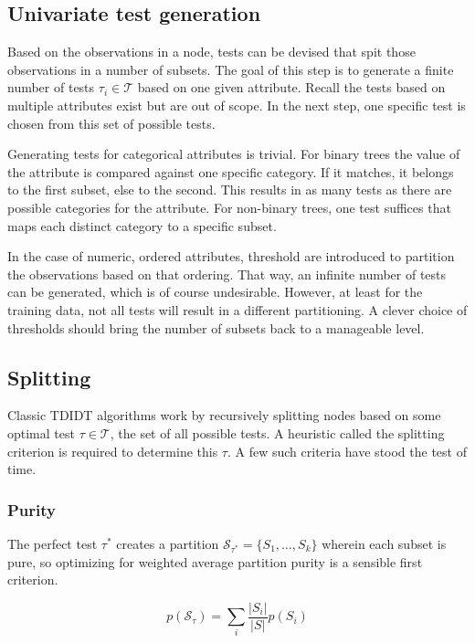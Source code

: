 \subsection{Univariate test generation}
Based on the observations in a node, tests can be devised that spit those observations in a number of subsets. The goal of this step is to generate a finite number of tests $\tau_i \in \mathcal{T}$ based on one given attribute. Recall the tests based on multiple attributes exist but are out of scope. In the next step, one specific test is chosen from this set of possible tests.

Generating tests for categorical attributes is trivial. For binary trees the value of the attribute is compared against one specific category. If it matches, it belongs to the first subset, else to the second. This results in as many tests as there are possible categories for the attribute. For non-binary trees, one test suffices that maps each distinct category to a specific subset.

In the case of numeric, ordered attributes, threshold are introduced to partition the observations based on that ordering. That way, an infinite number of tests can be generated, which is of course undesirable. However, at least for the training data, not all tests will result in a different partitioning. A clever choice of thresholds should bring the number of subsets back to a manageable level.


\subsection{Splitting}
Classic TDIDT algorithms work by recursively splitting nodes based on some optimal test $\tau \in \mathcal{T}$, the set of all possible tests. A heuristic called the splitting criterion is required to determine this $\tau$. A few such criteria have stood the test of time.

\subsubsection{Purity}
The perfect test $\tau^*$ creates a partition $\mathcal{S}_{\tau^*} = \{S_1, \ldots, S_k\}$ wherein each subset is pure, so optimizing for weighted average partition purity is a sensible first criterion.

\begin{equation}
    p(\mathcal{S}_\tau) = \sum_i \frac{|S_i|}{|S|} p(S_i)
\end{equation}

